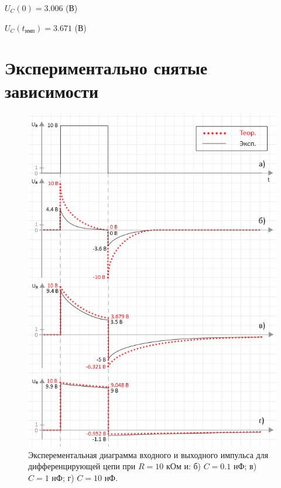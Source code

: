 	$U_C(0) = 3.006$ (В)
	
	$U_C(t_\text{имп}) = 3.671$ (В)

\section{Экспериментально снятые зависимости}

\begin{figure}[H]
	\begin{center}
		\includegraphics[width=14cm]{img/diff_with_theory2}
		\caption{Эксперементальная диаграмма входного и выходного импульса для дифференцирующей цепи при $R = 10$ кОм и: б) $C = 0.1$ нФ; в) $C = 1$ нФ; г) $C = 10$ нФ.} 
		\label{d:1} %
	\end{center}
\end{figure}

